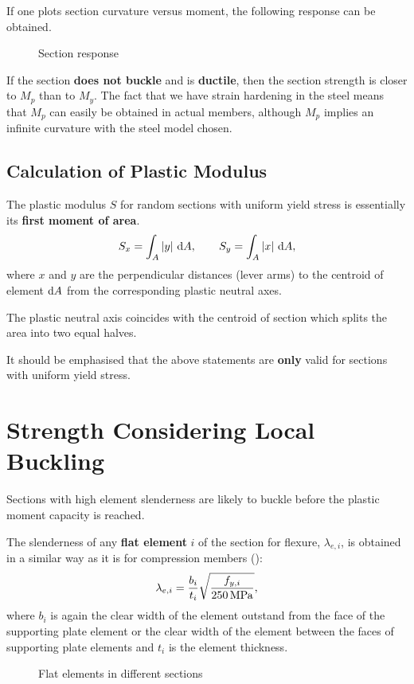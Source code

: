 If one plots section curvature versus moment, the following response can be obtained.
\begin{figure}[H]
\centering
\caption{Section response}
\end{figure}
If the section \textbf{does not buckle} and is \textbf{ductile}, then the section strength is closer to $M_p$ than to $M_y$.
The fact that we have strain hardening in the steel means that $M_p$ can easily be obtained in actual members, although $M_p$ implies an infinite curvature with the steel model chosen.
\subsection{Calculation of Plastic Modulus}
The plastic modulus $S$ for random sections with uniform yield stress is essentially its \textbf{first moment of area}.
\begin{gather*}
S_x=\int_A|y|~\mathrm{d}A,\qquad
S_y=\int_A|x|~\mathrm{d}A,
\end{gather*}
where $x$ and $y$ are the perpendicular distances (lever arms) to the centroid of element $\mathrm{d}A$ from the corresponding plastic neutral axes.

The plastic neutral axis coincides with the centroid of section which splits the area into two equal halves.

It should be emphasised that the above statements are \textbf{only} valid for sections with uniform yield stress.
\section{Strength Considering Local Buckling}
Sections with high element slenderness are likely to buckle before the plastic moment capacity is reached.

The slenderness of any \textbf{flat element} $i$ of the section for flexure, $\lambda_{e,i}$, is obtained in a similar way as it is for compression members ():
\begin{gather*}
\lambda_{e,i}=\dfrac{b_i}{t_i}\sqrt{\dfrac{f_{y,i}}{\SI{250}{\mega\pascal}}},
\end{gather*}
where $b_i$ is again the clear width of the element outstand from the face of the supporting plate element or the clear width of the element between the faces of supporting plate elements and $t_i$ is the element thickness.
\begin{figure}[H]
\centering

\caption{Flat elements in different sections}
\end{figure}


